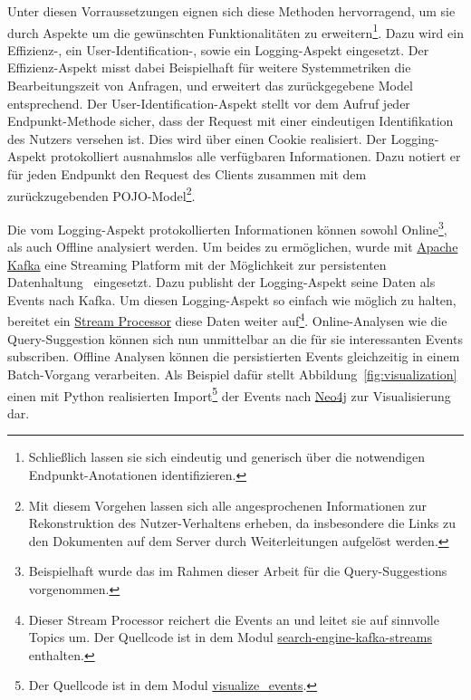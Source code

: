 Unter diesen Vorraussetzungen eignen sich diese Methoden hervorragend,
um sie durch Aspekte um die gewünschten Funktionalitäten zu erweitern\footnote{Schließlich lassen
sie sich eindeutig und generisch über die notwendigen Endpunkt-Anotationen
identifizieren.}.
Dazu wird ein Effizienz-, ein User-Identification-, sowie ein Logging-Aspekt eingesetzt.
Der Effizienz-Aspekt misst dabei Beispielhaft für weitere Systemmetriken die Bearbeitungszeit von Anfragen,
und erweitert das zurückgegebene Model entsprechend.
Der User-Identification-Aspekt stellt
vor dem Aufruf jeder Endpunkt-Methode sicher, dass der Request mit einer
eindeutigen Identifikation des Nutzers versehen ist.
Dies wird über einen Cookie realisiert.
Der Logging-Aspekt protokolliert ausnahmslos alle verfügbaren Informationen.
Dazu notiert er für jeden Endpunkt den Request des Clients zusammen mit dem zurückzugebenden
POJO-Model\footnote{Mit diesem Vorgehen lassen sich alle angesprochenen Informationen zur Rekonstruktion des Nutzer-Verhaltens erheben,
da insbesondere die Links zu den Dokumenten auf dem Server durch Weiterleitungen aufgelöst werden.}.

Die vom Logging-Aspekt protokollierten Informationen können sowohl
Online\footnote{Beispielhaft wurde das im Rahmen dieser Arbeit für die Query-Suggestions vorgenommen.},
als auch Offline analysiert werden.
Um beides zu ermöglichen, wurde mit \href{https://kafka.apache.org/}{Apache Kafka}
eine Streaming Platform mit der Möglichkeit zur persistenten Datenhaltung~\cite{kafka.foreword} eingesetzt.
Dazu publisht der Logging-Aspekt seine Daten als Events nach Kafka.
Um diesen Logging-Aspekt so einfach wie möglich zu halten, bereitet ein
\href{https://www.confluent.io/blog/introducing-kafka-streams-stream-processing-made-simple/}{Stream Processor}
diese Daten weiter auf\footnote{Dieser Stream Processor reichert die Events an und leitet sie
auf sinnvolle Topics um. Der Quellcode ist in dem Modul 
\href{https://github.com/mam10eks/search-homepage-of-university-leipzig/tree/master/search-engine-kafka-streams}
{search-engine-kafka-streams} enthalten.}.
Online-Analysen wie die Query-Suggestion können sich nun unmittelbar an die für sie interessanten Events subscriben.
Offline Analysen können die persistierten Events gleichzeitig in einem  Batch-Vorgang verarbeiten.
Als Beispiel dafür stellt Abbildung~\ref{fig:visualization} einen mit Python realisierten
Import\footnote{Der Quellcode ist in dem Modul
\href{https://github.com/mam10eks/search-homepage-of-university-leipzig/tree/master/visualize_events}{visualize\_events}.}
der Events nach \href{https://de.wikipedia.org/wiki/Neo4j}{Neo4j} zur Visualisierung dar.

